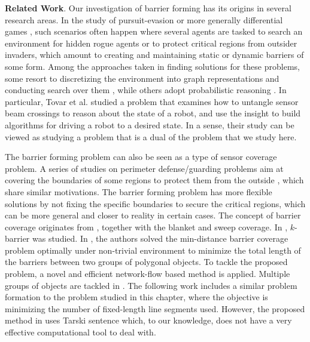 \noindent\textbf{Related Work}.
Our investigation of barrier forming has its origins in several research areas.
In the study of pursuit-evasion or more generally differential games \cite{ho1965differential,isaacs1999differential,hajek2008pursuit,tovar2009sensor,simov2000pursuit,guibas1997visibility,kameda2006online,kirousis1986searching, sachs2004visibility,lau2005optimal, yu2011shadow, olsen2022robust}, 
such scenarios often happen where several agents are tasked to search an environment for hidden rogue agents or to protect critical regions from outsider invaders, which amount to creating and maintaining static or dynamic barriers of some form.  
%
Among the approaches taken in finding solutions for these problems, some resort to discretizing the environment into graph representations and conducting search over them \cite{kirousis1986searching, sachs2004visibility}, while others adopt probabilistic reasoning \cite{lau2005optimal, yu2011shadow}. 
%
In particular, Tovar et al. \cite{tovar2009sensor} studied a problem that examines how to untangle sensor beam crossings to reason about the state of a robot, and use the insight to build algorithms for driving a robot to a desired state. In a sense, their study can be viewed as studying a problem that is a dual of the problem that we study here. 


The barrier forming problem can also be seen as a type of sensor coverage problem. 
%
A series of studies on perimeter defense/guarding problems aim at covering the boundaries of some regions to protect them from the outside \cite{shishika2020cooperative, macharet2020adaptive, fenghangaoyu2019efficient, fengyu2020optimally}, which share similar motivations. 
The barrier forming problem has more flexible solutions by not fixing the specific boundaries to secure the critical regions,
which can be more general and closer to reality in certain cases.
The concept of barrier coverage originates from \cite{gage1992command}, together with the blanket and sweep coverage. 
In \cite{kumar2005barrier}, $k$-barrier was studied. 
In \cite{kloder2007barrier}, the authors solved the min-distance barrier coverage problem optimally under non-trivial environment to minimize the total length of the barriers between two groups of polygonal objects. 
To tackle the proposed problem, a novel and efficient network-flow based method is applied. 
Multiple groups of objects are tackled in \cite{abrahamsen2020geometric}.
The following work \cite{kloder2008thesis} includes a similar problem formation to the problem studied in this chapter, where the objective is minimizing the number of fixed-length line segments used. 
%
However, the proposed method in \cite{kloder2008thesis} uses Tarski sentence \cite{tarski1949decision} which, to our knowledge, does not have a very effective computational tool to deal with.

